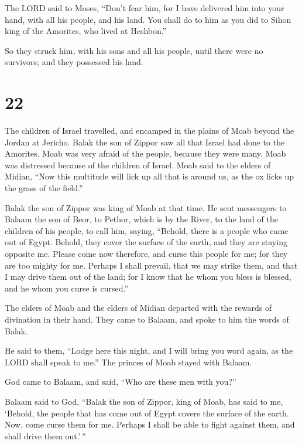  The LORD said to Moses, ``Don't fear him, for I have
delivered him into your hand, with all his people, and his land. You
shall do to him as you did to Sihon king of the Amorites, who lived at
Heshbon.''

 So they struck him, with his sons and all his people,
until there were no survivors; and they possessed his land.

\hypertarget{section-21}{%
\section{22}\label{section-21}}

 The children of Israel travelled, and encamped in the
plains of Moab beyond the Jordan at Jericho.  Balak the son
of Zippor saw all that Israel had done to the Amorites. 
Moab was very afraid of the people, because they were many. Moab was
distressed because of the children of Israel.  Moab said to
the elders of Midian, ``Now this multitude will lick up all that is
around us, as the ox licks up the grass of the field.''

Balak the son of Zippor was king of Moab at that time.  He
sent messengers to Balaam the son of Beor, to Pethor, which is by the
River, to the land of the children of his people, to call him, saying,
``Behold, there is a people who came out of Egypt. Behold, they cover
the surface of the earth, and they are staying opposite me. 
Please come now therefore, and curse this people for me; for they are
too mighty for me. Perhaps I shall prevail, that we may strike them, and
that I may drive them out of the land; for I know that he whom you bless
is blessed, and he whom you curse is cursed.''

 The elders of Moab and the elders of Midian departed with
the rewards of divination in their hand. They came to Balaam, and spoke
to him the words of Balak.

 He said to them, ``Lodge here this night, and I will bring
you word again, as the LORD shall speak to me.'' The princes of Moab
stayed with Balaam.

 God came to Balaam, and said, ``Who are these men with
you?''

 Balaam said to God, ``Balak the son of Zippor, king of
Moab, has said to me,  `Behold, the people that has come
out of Egypt covers the surface of the earth. Now, come curse them for
me. Perhaps I shall be able to fight against them, and shall drive them
out.'\,''

